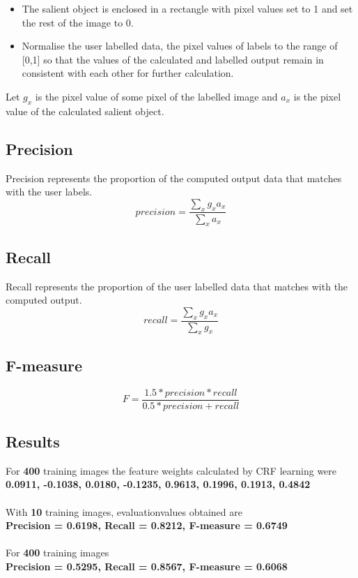 \documentclass[11pt]{report}
\begin{document}
\begin{itemize}
\item
The salient object is enclosed in a rectangle with pixel values set to 1 and set the rest of the image to 0.

\item
Normalise the user labelled data, the pixel values of labels to the range of [0,1] so that the values of the calculated and labelled output remain in consistent with each other for further calculation.
\end{itemize}
Let $g_x$ is the pixel value of some pixel of the labelled image and $a_x$ is the pixel value of the calculated salient object.

\subsection*{Precision}
Precision represents the proportion of the computed output data that matches with the user labels.
\begin{equation}
precision = \frac{\sum_{x}g_xa_x}{\sum _x a_x}
\end{equation}

\subsection*{Recall}
Recall represents the proportion of the user labelled data that matches with the computed output.
\begin{equation}
recall = \frac{\sum_{x}g_xa_x}{\sum _x g_x}
\end{equation}

\subsection*{F-measure}
\begin{equation}
F= \frac{1.5 * precision* recall }{0.5*precision + recall}
\end{equation}

\subsection*{Results}
For {\bf400} training images the feature weights calculated by CRF learning were \\
{\bf    0.0911, -0.1038, 0.0180, -0.1235, 0.9613, 0.1996, 0.1913, 0.4842}\\\\
With {\bf10} training images, evaluationvalues obtained are\\
{\bf
Precision = 0.6198, 
Recall = 0.8212, 
F-measure = 0.6749
}\\ \\
For {\bf400} training images \\
{\bf
Precision = 0.5295,
Recall = 0.8567,
F-measure = 0.6068\\
} 
\end{document}
